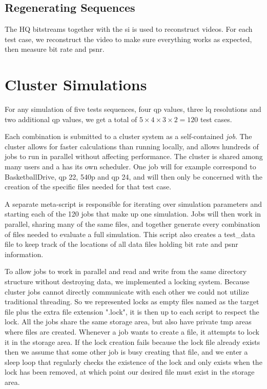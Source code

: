 \subsection{Regenerating Sequences}
The HQ bitstreams together with the \gls{si} is used to reconstruct videos. For each test case, we reconstruct the video to make sure everything works as expected, then measure bit rate and \gls{psnr}.


\section{Cluster Simulations}
\label{subsec:cluster}
For any simulation of five tests sequences, four \gls{qp} values, three \gls{lq} resolutions and two additional \gls{qp} values, we get a total of $5 \times 4 \times 3 \times2 = 120$ test cases.

Each combination is submitted to a cluster system as a self-contained \textit{job}. The cluster allows for faster calculations than running locally, and allows hundreds of jobs to run in parallel without affecting performance. The cluster is shared among many users and a has its own scheduler. One job will for example correspond to BasketballDrive, \gls{qp} 22, 540p and \gls{qp} 24, and will then only be concerned with the creation of the specific files needed for that test case.

A separate meta-script is responsible for iterating over simulation parameters and starting each of the 120 jobs that make up one simulation. Jobs will then work in parallel, sharing many of the same files, and together generate every combination of files needed to evaluate a full simulation. This script also creates a test{\_}data file to keep track of the locations of all data files holding bit rate and \gls{psnr} information.

To allow jobs to work in parallel and read and write from the same directory structure without destroying data, we implemented a locking system. Because cluster jobs cannot directly communicate with each other we could not utilize traditional threading. So we represented locks as empty files named as the target file plus the extra file extension ".lock", it is then up to each script to respect the lock. All the jobs share the same storage area, but also have private tmp areas where files are created. Whenever a job wants to create a file, it attempts to lock it in the storage area. If the lock creation fails because the lock file already exists then we assume that some other job is busy creating that file, and we enter a sleep loop that regularly checks the existence of the lock and only exists when the lock has been removed, at which point our desired file must exist in the storage area.

